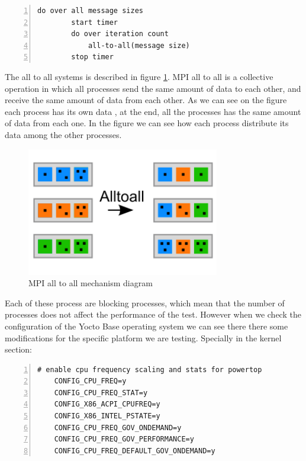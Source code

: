 \begin{lstlisting}[frame=single,numbers=left]
    do over all message sizes 
        start timer
        do over iteration count 
            all-to-all(message size)
        stop timer
\end{lstlisting}

The all to all systems is described in figure \ref{mpi_all_to_all_example}.
MPI all to all  is a collective operation in which all processes send the same
amount of data to each other, and receive the same amount of data from each
other. As we can see on the figure each process has its own data , at the end,
all the processes has the same amount of data from each one. In the figure we
can see how each process distribute its data among the other processes.

\begin{figure}[H]
\centering
\includegraphics[width=0.75\textwidth]{images/mpi_all_to_all.png}
\caption{MPI all to all mechanism diagram}
\label{mpi_all_to_all_example}
\end{figure}

Each of these process are blocking processes, which mean that the number of
processes does not affect the performance of the test. However when we check
the configuration of the Yocto Base operating system we can see there there
some modifications for the specific platform we are testing. Specially in the
kernel section: 

\begin{lstlisting}[frame=single,numbers=left]
    # enable cpu frequency scaling and stats for powertop
    CONFIG_CPU_FREQ=y
    CONFIG_CPU_FREQ_STAT=y
    CONFIG_X86_ACPI_CPUFREQ=y
    CONFIG_X86_INTEL_PSTATE=y
    CONFIG_CPU_FREQ_GOV_ONDEMAND=y
    CONFIG_CPU_FREQ_GOV_PERFORMANCE=y
    CONFIG_CPU_FREQ_DEFAULT_GOV_ONDEMAND=y
\end{lstlisting}


